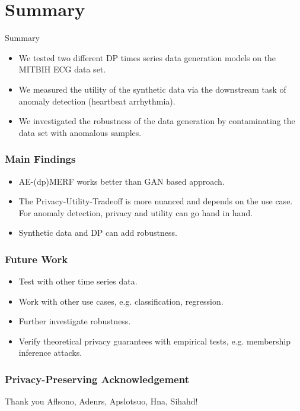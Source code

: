\section{Summary}
\begin{frame}{Summary}
    \begin{itemize}
        \item<1-> We tested two different \alert{DP times series data generation} models on the MITBIH ECG data set.
        \item<2-> We measured the \alert{utility} of the synthetic data via the downstream task of anomaly detection (heartbeat arrhythmia).
        \item<3-> We investigated the \alert{robustness} of the data generation by \alert{contaminating} the data set with anomalous samples.
    \end{itemize}
\end{frame}

\begin{frame}
    \frametitle{Main Findings}
        \begin{itemize}
            \item<1-> AE-(dp)MERF works better than GAN based approach.
            \item<2-> The \alert{Privacy-Utility-Tradeoff is more nuanced} and depends on the use case. For anomaly detection, privacy and utility can go hand in hand.
            \item<3-> Synthetic data and DP can add \alert{robustness}.
        \end{itemize}
\end{frame}

\begin{frame}
    \frametitle{Future Work}
    \begin{itemize}
        \item<1-> Test with \alert{other time series data}.
        \item<2-> Work with \alert{other use cases}, e.g. classification, regression.
        \item<3-> Further investigate \alert{robustness}.
        \item<4-> Verify theoretical privacy guarantees with empirical tests, e.g. \alert{membership inference attacks}.
    \end{itemize}
\end{frame}

\begin{frame}
    \frametitle{Privacy-Preserving Acknowledgement}

    \huge
    Thank you Aflsono, Adenrs, Apslotsuo, Hna, Sihahd!
    

\end{frame}